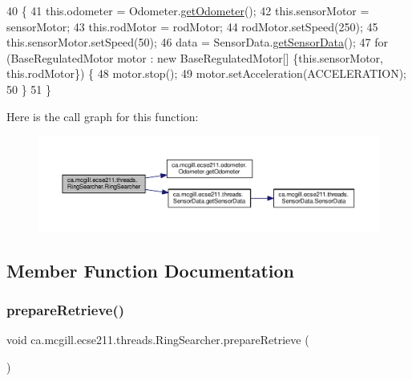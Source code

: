 \begin{DoxyCode}
40                                 \{
41     this.odometer = Odometer.\hyperlink{classca_1_1mcgill_1_1ecse211_1_1odometer_1_1_odometer_a99171f11e34dea918fa9dd069d721439}{getOdometer}();
42     this.sensorMotor = sensorMotor;
43     this.rodMotor = rodMotor;
44     rodMotor.setSpeed(250);
45     this.sensorMotor.setSpeed(50);
46     data = SensorData.\hyperlink{classca_1_1mcgill_1_1ecse211_1_1threads_1_1_sensor_data_a8260aba53b4474ca1275e4ce26157977}{getSensorData}();
47     \textcolor{keywordflow}{for} (BaseRegulatedMotor motor : \textcolor{keyword}{new} BaseRegulatedMotor[] \{this.sensorMotor, this.rodMotor\}) \{
48       motor.stop();
49       motor.setAcceleration(ACCELERATION);
50     \}
51   \}
\end{DoxyCode}
Here is the call graph for this function\+:
\nopagebreak
\begin{figure}[H]
\begin{center}
\leavevmode
\includegraphics[width=350pt]{classca_1_1mcgill_1_1ecse211_1_1threads_1_1_ring_searcher_af36dd15db12c915245199bef646137ed_cgraph}
\end{center}
\end{figure}


\subsection{Member Function Documentation}
\mbox{\label{classca_1_1mcgill_1_1ecse211_1_1threads_1_1_ring_searcher_a6cbee26320e250b07e4f4b14f60d39a0}} 
\subsubsection{\texorpdfstring{prepare\+Retrieve()}{prepareRetrieve()}}
{\footnotesize\ttfamily void ca.\+mcgill.\+ecse211.\+threads.\+Ring\+Searcher.\+prepare\+Retrieve (\begin{DoxyParamCaption}{ }\end{DoxyParamCaption})}

